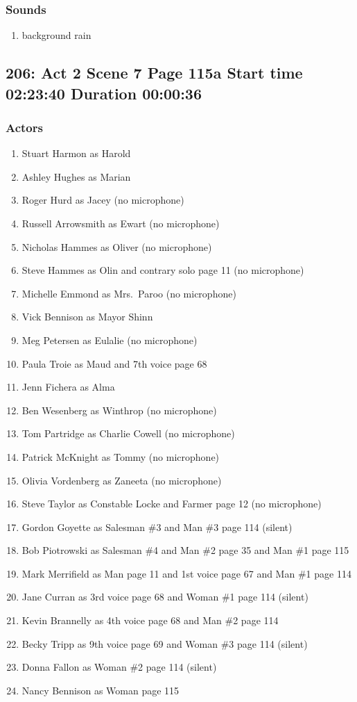 \subsubsection{Sounds}
\begin{enumerate}
\item background rain
\end{enumerate}
\subsection{206: Act 2 Scene 7 Page 115a Start time 02:23:40 Duration 00:00:36}

\subsubsection{Actors}
\begin{enumerate}
\item Stuart Harmon as Harold
\item Ashley Hughes as Marian
\item Roger Hurd as Jacey (no microphone)
\item Russell Arrowsmith as Ewart (no microphone)
\item Nicholas Hammes as Oliver (no microphone)
\item Steve Hammes as Olin and contrary solo page 11 (no microphone)
\item Michelle Emmond as Mrs.~Paroo (no microphone)
\item Vick Bennison as Mayor Shinn
\item Meg Petersen as Eulalie (no microphone)
\item Paula Troie as Maud and 7th voice page 68
\item Jenn Fichera as Alma
\item Ben Wesenberg as Winthrop (no microphone)
\item Tom Partridge as Charlie Cowell (no microphone)
\item Patrick McKnight as Tommy (no microphone)
\item Olivia Vordenberg as Zaneeta (no microphone)
\item Steve Taylor as Constable Locke and Farmer page 12 (no microphone)
\item Gordon Goyette as Salesman \#3 and Man \#3 page 114 (silent)
\item Bob Piotrowski as Salesman \#4 and Man \#2 page 35 and Man \#1 page 115
\item Mark Merrifield as Man page 11 and 1st voice page 67 and Man \#1 page 114
\item Jane Curran as 3rd voice page 68 and Woman \#1 page 114 (silent)
\item Kevin Brannelly as 4th voice page 68 and Man \#2 page 114
\item Becky Tripp as 9th voice page 69 and Woman \#3 page 114 (silent)
\item Donna Fallon as Woman \#2 page 114 (silent)
\item Nancy Bennison as Woman page 115
\end{enumerate}

